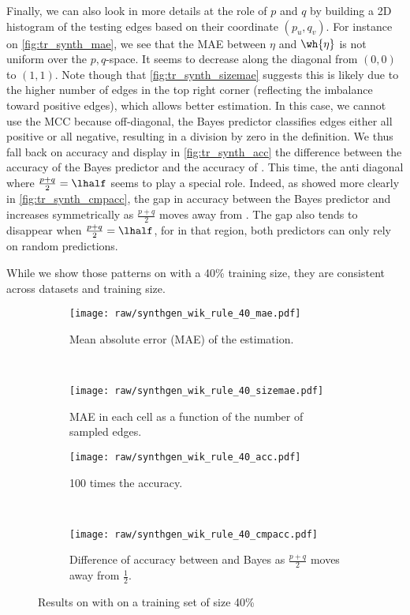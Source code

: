 \begin{newcontent}
Finally, we can also look in more details at the role of $p$ and $q$ by building a 2D histogram of
the testing edges \euv{} based on their coordinate $(p_u, q_v)$. For instance on
\autoref{fig:tr_synth_mae}, we see that the MAE between $\eta$ and $\wh{\eta}$ is not uniform over
the $p,q$-space. It seems to decrease along the diagonal from $(0,0)$ to $(1,1)$. Note though that
\autoref{fig:tr_synth_sizemae} suggests this is likely due to the higher number of edges in the top
right corner (reflecting the imbalance toward positive edges), which allows better estimation. 
In this case, we cannot use the MCC because off-diagonal, the Bayes predictor classifies edges
either all positive or all negative, resulting in a division by zero in the definition. We thus
fall back on accuracy and display in \autoref{fig:tr_synth_acc} the difference between the accuracy
of the Bayes predictor and the accuracy of \usrule{}. This time, the anti diagonal where
$\frac{p+q}{2}=\lhalf$ seems to play a special role. Indeed, as showed more clearly in
\autoref{fig:tr_synth_cmpacc}, the gap in accuracy between the Bayes predictor and \usrule{}
increases symmetrically as $\frac{p+q}{2}$ moves away from \shalf{}. The gap also tends to disappear
when $\frac{p+q}{2}=\lhalf$, for in that region, both predictors can only rely on random predictions.

While we show those patterns on \wik{} with a 40\% training size, they are consistent across
datasets and training size.
\end{newcontent}

\begin{figure*}[hbtp]
  \begin{subfigure}[b]{0.504\textwidth} 
    \texttt{[image: raw/synthgen\_wik\_rule\_40\_mae.pdf]} 
    \caption{Mean absolute error (MAE) of the \etauv{} estimation.} 
    \label{fig:tr_synth_mae}
  \end{subfigure}~
  \begin{subfigure}[b]{0.504\textwidth} 
    \texttt{[image: raw/synthgen\_wik\_rule\_40\_sizemae.pdf]} 
    \caption{MAE in each cell as a function of the number of sampled edges.} 
    \label{fig:tr_synth_sizemae}
  \end{subfigure}

  \begin{subfigure}[b]{0.504\textwidth} 
    \texttt{[image: raw/synthgen\_wik\_rule\_40\_acc.pdf]} 
    \caption{100 times the accuracy.} 
    \label{fig:tr_synth_acc}
  \end{subfigure}~
  \begin{subfigure}[b]{0.504\textwidth} 
    \texttt{[image: raw/synthgen\_wik\_rule\_40\_cmpacc.pdf]} 
    \caption{Difference of accuracy between \usrule{} and Bayes as $\frac{p+q}{2}$ moves away from $\frac{1}{2}$.} 
    \label{fig:tr_synth_cmpacc}
  \end{subfigure}
  \caption{Results on \wik{} with \usrule{} on a training set of size 40\%}
\end{figure*}

